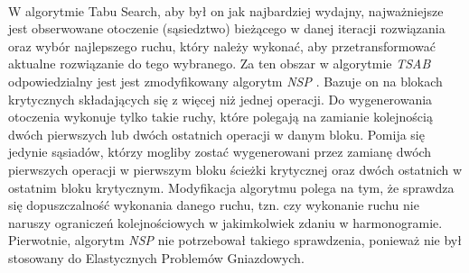 \documentclass[printmode,oneside]{mgr}
\begin{document}
\ \\W algorytmie Tabu Search, aby był on jak najbardziej wydajny, najważniejsze jest obserwowane otoczenie (sąsiedztwo) bieżącego w danej iteracji rozwiązania oraz wybór najlepszego ruchu, który należy wykonać, aby przetransformować aktualne rozwiązanie do tego wybranego. Za ten obszar w algorytmie \emph{TSAB} odpowiedzialny jest jest zmodyfikowany algorytm \emph{NSP} \cite{Smutnicki96}. Bazuje on na blokach krytycznych składających się z więcej niż jednej operacji. Do wygenerowania otoczenia wykonuje tylko takie ruchy, które polegają na zamianie kolejnością dwóch pierwszych lub dwóch ostatnich operacji w danym bloku. Pomija się jedynie sąsiadów, którzy mogliby zostać wygenerowani przez zamianę dwóch pierwszych operacji w pierwszym bloku ścieżki krytycznej oraz dwóch ostatnich w ostatnim bloku krytycznym. Modyfikacja algorytmu polega na tym, że sprawdza się dopuszczalność wykonania danego ruchu, tzn. czy wykonanie ruchu nie naruszy ograniczeń kolejnościowych w jakimkolwiek zdaniu w harmonogramie. Pierwotnie, algorytm \emph{NSP} nie potrzebował takiego sprawdzenia, ponieważ nie był stosowany do Elastycznych Problemów Gniazdowych.
\end{document}

